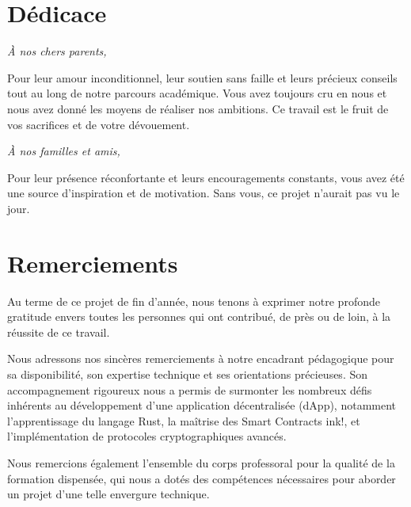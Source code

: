 \documentclass[12pt,a4paper]{report}
\begin{document}
\chapter*{Dédicace}
\vspace*{2cm}
\begin{center}
\textit{À nos chers parents,}\\[0.5cm]
\end{center}
Pour leur amour inconditionnel, leur soutien sans faille et leurs précieux conseils tout au long de notre parcours académique. Vous avez toujours cru en nous et nous avez donné les moyens de réaliser nos ambitions. Ce travail est le fruit de vos sacrifices et de votre dévouement.\\[1cm]
\begin{center}
\textit{À nos familles et amis,}\\[0.5cm]
\end{center}
Pour leur présence réconfortante et leurs encouragements constants, vous avez été une source d'inspiration et de motivation. Sans vous, ce projet n'aurait pas vu le jour.

\chapter*{Remerciements}
Au terme de ce projet de fin d'année, nous tenons à exprimer notre profonde gratitude envers toutes les personnes qui ont contribué, de près ou de loin, à la réussite de ce travail.

Nous adressons nos sincères remerciements à notre encadrant pédagogique pour sa disponibilité, son expertise technique et ses orientations précieuses. Son accompagnement rigoureux nous a permis de surmonter les nombreux défis inhérents au développement d'une application décentralisée (dApp), notamment l'apprentissage du langage Rust, la maîtrise des Smart Contracts ink!, et l'implémentation de protocoles cryptographiques avancés.

Nous remercions également l'ensemble du corps professoral pour la qualité de la formation dispensée, qui nous a dotés des compétences nécessaires pour aborder un projet d'une telle envergure technique.
\end{document}
